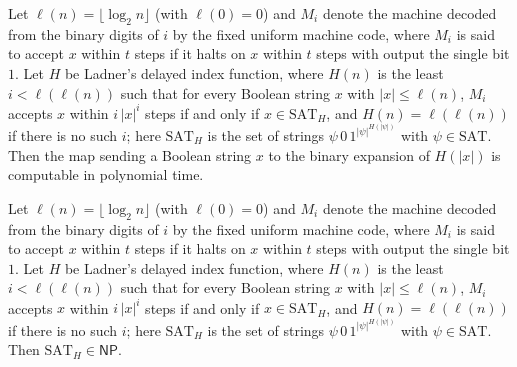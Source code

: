 \begin{theorem}
\label{Complexity.ladnerH_polyTime}
\leanok
{}
Let $\ell(n)=\lfloor\log_2 n\rfloor$ (with $\ell(0)=0$) and $M_i$ denote the machine decoded from the binary digits of $i$ by the fixed uniform machine code, where $M_i$ is said to accept $x$ within $t$ steps if it halts on $x$ within $t$ steps with output the single bit $1$. Let $H$ be Ladner's delayed index function, where $H(n)$ is the least $i<\ell(\ell(n))$ such that for every Boolean string $x$ with $|x|\le\ell(n)$, $M_i$ accepts $x$ within $i\,|x|^i$ steps if and only if $x\in\mathrm{SAT}_H$, and $H(n)=\ell(\ell(n))$ if there is no such $i$; here $\mathrm{SAT}_H$ is the set of strings $\psi\,0\,1^{|\psi|^{H(|\psi|)}}$ with $\psi\in\mathrm{SAT}$. Then the map sending a Boolean string $x$ to the binary
expansion of $H(|x|)$ is computable in polynomial time.
\end{theorem}

\begin{theorem}
\label{Complexity.SAT_H_mem_NP}
\leanok
{}
Let $\ell(n)=\lfloor\log_2 n\rfloor$ (with $\ell(0)=0$) and $M_i$ denote the machine decoded from the binary digits of $i$ by the fixed uniform machine code, where $M_i$ is said to accept $x$ within $t$ steps if it halts on $x$ within $t$ steps with output the single bit $1$. Let $H$ be Ladner's delayed index function, where $H(n)$ is the least $i<\ell(\ell(n))$ such that for every Boolean string $x$ with $|x|\le\ell(n)$, $M_i$ accepts $x$ within $i\,|x|^i$ steps if and only if $x\in\mathrm{SAT}_H$, and $H(n)=\ell(\ell(n))$ if there is no such $i$; here $\mathrm{SAT}_H$ is the set of strings $\psi\,0\,1^{|\psi|^{H(|\psi|)}}$ with $\psi\in\mathrm{SAT}$. Then $\mathrm{SAT}_H\in\mathsf{NP}$.
\end{theorem}

